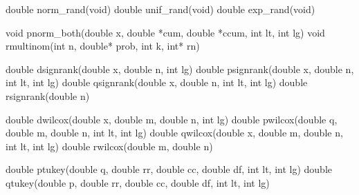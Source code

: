 \documentclass[]{book}
\newenvironment{Shaded}{\begin{snugshade}}{\end{snugshade}}
\newcommand{\DataTypeTok}[1]{\textcolor[rgb]{0.13,0.29,0.53}{#1}}
\newcommand{\NormalTok}[1]{#1}
\begin{document}
\begin{Shaded}
\begin{Highlighting}[]
\DataTypeTok{double}\NormalTok{ norm_rand(}\DataTypeTok{void}\NormalTok{)  }
\DataTypeTok{double}\NormalTok{ unif_rand(}\DataTypeTok{void}\NormalTok{)  }
\DataTypeTok{double}\NormalTok{ exp_rand(}\DataTypeTok{void}\NormalTok{)}

\DataTypeTok{void}\NormalTok{ pnorm_both(}\DataTypeTok{double}\NormalTok{ x, }\DataTypeTok{double}\NormalTok{ *cum, }\DataTypeTok{double}\NormalTok{ *ccum, }\DataTypeTok{int}\NormalTok{ lt, }\DataTypeTok{int}\NormalTok{ lg)}
\DataTypeTok{void}\NormalTok{ rmultinom(}\DataTypeTok{int}\NormalTok{ n, }\DataTypeTok{double}\NormalTok{* prob, }\DataTypeTok{int}\NormalTok{ k, }\DataTypeTok{int}\NormalTok{* rn) }

\DataTypeTok{double}\NormalTok{ dsignrank(}\DataTypeTok{double}\NormalTok{ x, }\DataTypeTok{double}\NormalTok{ n, }\DataTypeTok{int}\NormalTok{ lg)            }
\DataTypeTok{double}\NormalTok{ psignrank(}\DataTypeTok{double}\NormalTok{ x, }\DataTypeTok{double}\NormalTok{ n, }\DataTypeTok{int}\NormalTok{ lt, }\DataTypeTok{int}\NormalTok{ lg)        }
\DataTypeTok{double}\NormalTok{ qsignrank(}\DataTypeTok{double}\NormalTok{ x, }\DataTypeTok{double}\NormalTok{ n, }\DataTypeTok{int}\NormalTok{ lt, }\DataTypeTok{int}\NormalTok{ lg)        }
\DataTypeTok{double}\NormalTok{ rsignrank(}\DataTypeTok{double}\NormalTok{ n)}

\DataTypeTok{double}\NormalTok{ dwilcox(}\DataTypeTok{double}\NormalTok{ x, }\DataTypeTok{double}\NormalTok{ m, }\DataTypeTok{double}\NormalTok{ n, }\DataTypeTok{int}\NormalTok{ lg)        }
\DataTypeTok{double}\NormalTok{ pwilcox(}\DataTypeTok{double}\NormalTok{ q, }\DataTypeTok{double}\NormalTok{ m, }\DataTypeTok{double}\NormalTok{ n, }\DataTypeTok{int}\NormalTok{ lt, }\DataTypeTok{int}\NormalTok{ lg)    }
\DataTypeTok{double}\NormalTok{ qwilcox(}\DataTypeTok{double}\NormalTok{ x, }\DataTypeTok{double}\NormalTok{ m, }\DataTypeTok{double}\NormalTok{ n, }\DataTypeTok{int}\NormalTok{ lt, }\DataTypeTok{int}\NormalTok{ lg)    }
\DataTypeTok{double}\NormalTok{ rwilcox(}\DataTypeTok{double}\NormalTok{ m, }\DataTypeTok{double}\NormalTok{ n)}

\DataTypeTok{double}\NormalTok{ ptukey(}\DataTypeTok{double}\NormalTok{ q, }\DataTypeTok{double}\NormalTok{ rr, }\DataTypeTok{double}\NormalTok{ cc, }\DataTypeTok{double}\NormalTok{ df, }\DataTypeTok{int}\NormalTok{ lt, }\DataTypeTok{int}\NormalTok{ lg)    }
\DataTypeTok{double}\NormalTok{ qtukey(}\DataTypeTok{double}\NormalTok{ p, }\DataTypeTok{double}\NormalTok{ rr, }\DataTypeTok{double}\NormalTok{ cc, }\DataTypeTok{double}\NormalTok{ df, }\DataTypeTok{int}\NormalTok{ lt, }\DataTypeTok{int}\NormalTok{ lg)}



\end{Highlighting}
\end{Shaded}
\end{document}
